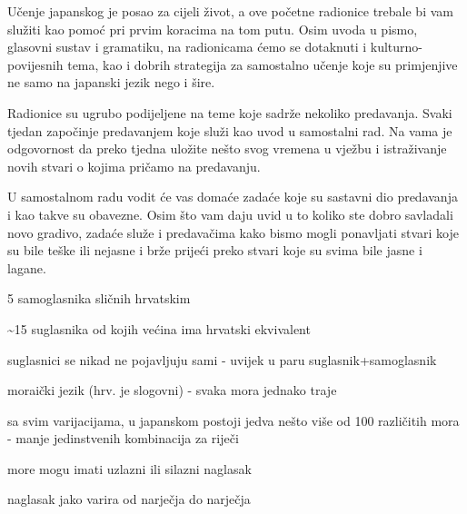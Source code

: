 
\author{Tomislav Mamić}

	
	
	Učenje japanskog je posao za cijeli život, a ove početne radionice trebale bi vam služiti kao pomoć pri prvim koracima na tom putu. Osim uvoda u pismo, glasovni sustav i gramatiku, na radionicama ćemo se dotaknuti i kulturno-povijesnih tema, kao i dobrih strategija za samostalno učenje koje su primjenjive ne samo na japanski jezik nego i šire.
	
	
	Radionice su ugrubo podijeljene na teme koje sadrže nekoliko predavanja. Svaki tjedan započinje predavanjem koje služi kao uvod u samostalni rad. Na vama je odgovornost da preko tjedna uložite nešto svog vremena u vježbu i istraživanje novih stvari o kojima pričamo na predavanju.
	
	
	U samostalnom radu vodit će vas domaće zadaće koje su sastavni dio predavanja i kao takve su obavezne. Osim što vam daju uvid u to koliko ste dobro savladali novo gradivo, zadaće služe i predavačima kako bismo mogli ponavljati stvari koje su bile teške ili nejasne i brže prijeći preko stvari koje su svima bile jasne i lagane.
	
	
	\begin{hyou}
		\item 5 samoglasnika sličnih hrvatskim
		\item \textasciitilde15 suglasnika od kojih većina ima hrvatski ekvivalent
		\item suglasnici se nikad ne pojavljuju sami - uvijek u paru suglasnik+samoglasnik
		\item moraički jezik (hrv. je slogovni) - svaka mora jednako traje
		\item sa svim varijacijama, u japanskom postoji jedva nešto više od 100 različitih mora - manje jedinstvenih kombinacija za riječi
		\item more mogu imati uzlazni ili silazni naglasak
		\item naglasak jako varira od narječja do narječja
	\end{hyou}

